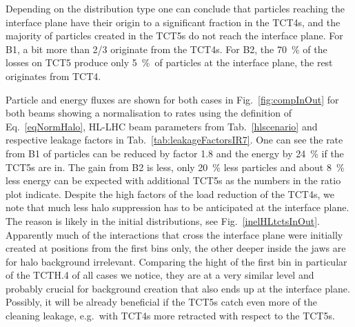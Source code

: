 Depending on the distribution type one can conclude that particles reaching the interface plane have their origin to a significant fraction in the TCT4s, and the majority of particles created in the TCT5s do not reach the interface plane. For B1, a bit more than 2/3 originate from the TCT4s. For B2, the 70~\% of the losses on TCT5 produce only 5~\%~of particles at the interface plane, the rest originates from TCT4. 

Particle and energy fluxes are shown for both cases in Fig.~\ref{fig:compInOut} for both beams showing a normalisation to rates using the definition of Eq.~\ref{eqNormHalo}, HL-LHC beam parameters from Tab.~\ref{hlscenario} and respective leakage factors in Tab.~\ref{tab:leakageFactorsIR7}. One can see the rate from B1 of particles can be reduced by factor 1.8 and the energy by 24~\% if the TCT5s are in. The gain from B2 is less, only 20~\% less particles and about 8~\% less energy can be expected with additional TCT5s as the numbers in the ratio plot indicate. Despite the high factors of the load reduction of the TCT4s, we note that much less halo suppression has to be anticipated at the interface plane. The reason is likely in the initial distributions, see Fig.~\ref{inelHLtctsInOut}. Apparently much of the interactions that cross the interface plane were initially created at positions from the first bins only, the other deeper inside the jaws are for halo background irrelevant. Comparing the hight of the first bin in particular of the TCTH.4 of all cases we notice, they are at a very similar level and probably crucial for background creation that also ends up at the interface plane. Possibly, it will be already beneficial if the TCT5s catch even more of the cleaning leakage, e.g.~with TCT4s more retracted with respect to the TCT5s.




